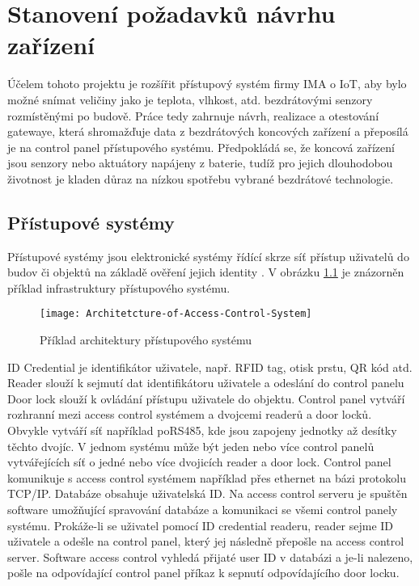 \chapter{Stanovení požadavků návrhu zařízení}


Účelem tohoto projektu je rozšířit přístupový systém firmy IMA o IoT, aby bylo možné snímat veličiny jako je teplota, vlhkost, atd. bezdrátovými senzory rozmístěnými po budově.
Práce tedy zahrnuje návrh, realizace a otestování gatewaye, která shromažďuje data z bezdrátových koncových zařízení a přeposílá je na control panel přístupového systému. 
Předpokládá se, že koncová zařízení jsou senzory nebo aktuátory napájeny z baterie, tudíž pro jejich dlouhodobou životnost je kladen důraz na nízkou spotřebu vybrané bezdrátové technologie.



\section{Přístupové systémy}
Přístupové systémy jsou elektronické systémy řídící skrze síť přístup uživatelů do budov či objektů na základě ověření jejich identity \cite{accessControlSystem_eiprocus}.
V obrázku \ref{fig:Access control system architecture} je znázorněn příklad infrastruktury přístupového systému.

\begin{figure}[!h]
    \centering
    \texttt{[image: Architetcture-of-Access-Control-System]}
    \caption{Příklad architektury přístupového systému \cite{accessControlSystem_eiprocus}}
    \label{fig:Access control system architecture}
\end{figure}

ID Credential je identifikátor uživatele, např. RFID tag, otisk prstu, QR kód atd.
Reader slouží k sejmutí dat identifikátoru uživatele a odeslání do control panelu
Door lock slouží k ovládání přístupu uživatele do objektu.
Control panel vytváří rozhranní mezi access control systémem a dvojcemi readerů a door locků. 
Obvykle vytváří síť například poRS485, kde jsou zapojeny jednotky až desítky těchto dvojíc. 
V jednom systému může být jeden nebo více control panelů vytvářejících síť o jedné nebo více dvojicích reader a door lock.
Control panel komunikuje s access control systémem například přes ethernet na bázi protokolu TCP/IP.
Databáze obsahuje uživatelská ID.
Na access control serveru je spuštěn software umožňující spravování databáze a komunikaci se všemi control panely systému.
Prokáže-li se uživatel pomocí ID credential readeru, reader sejme ID uživatele a odešle na control panel, který jej následně přepošle na access control server.
Software access control vyhledá přijaté user ID v databázi a je-li nalezeno, pošle na odpovídající control panel příkaz k sepnutí odpovídajícího door locku.



